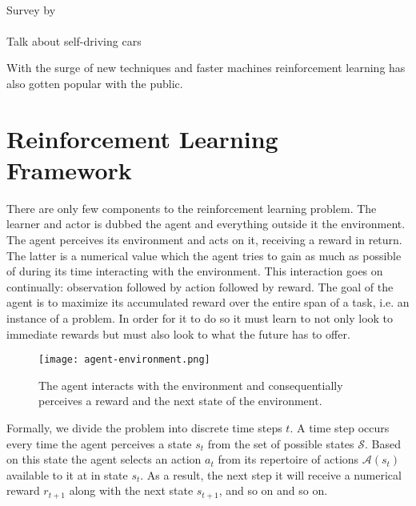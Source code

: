 \paragraph{}
Survey by \cite{Kober2013}

\paragraph{}
Talk about self-driving cars

With the surge of new techniques and faster machines
reinforcement learning has also gotten popular with the public.


\section{Reinforcement Learning Framework}
There are only few components to the reinforcement learning problem.
The learner and actor is dubbed the agent and everything outside it the environment.
The agent perceives its environment and acts on it,
receiving a reward in return.
The latter is a numerical value
which the agent tries to gain as much as possible of
during its time interacting with the environment.
This interaction goes on continually:
observation followed by action followed by reward.
The goal of the agent is to maximize its accumulated reward
over the entire span of a task,
i.e. an instance of a problem.
In order for it to do so
it must learn to not only look to immediate rewards
but must also look to what the future has to offer.

\begin{figure}[h]
	\center
	\texttt{[image: agent-environment.png]}
	\caption{The agent interacts with the environment and consequentially perceives a reward and the next state of the environment.}
	\label{agent-env}
\end{figure}

Formally, we divide the problem into discrete time steps $t$.
A time step occurs every time the agent perceives a state $s_t$
from the set of possible states $\mathcal{S}$.
Based on this state the agent selects an action $a_t$
from its repertoire of actions $\mathcal{A}(s_t)$
available to it at in state $s_t$.
As a result, the next step it will receive a numerical reward $r_{t+1}$
along with the next state $s_{t+1}$,
and so on and so on.

